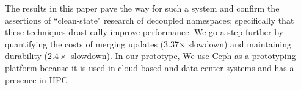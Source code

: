 The results in this paper pave the way for such a system and confirm the
assertions of ``clean-state" research of decoupled namespaces; specifically
that these techniques drastically improve performance.  We go a step further by
quantifying the costs of merging updates (3.37\(\times\) slowdown) and
maintaining durability (\(2.4\times\) slowdown).  In our prototype,
  We use Ceph as a prototyping platform
because it is used in cloud-based and data center systems and has a presence in
HPC~\cite{wang:pdsw13-ceph-hpc}.


